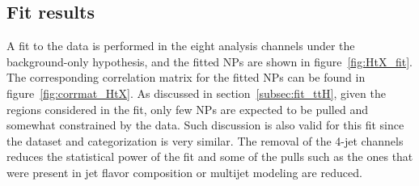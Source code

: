 \subsection{Fit results}
A fit to the data  is performed in the eight analysis channels under the background-only hypothesis, and the fitted NPs are shown in figure~\ref{fig:HtX_fit}.
The corresponding correlation matrix for the
fitted NPs can be found in figure~\ref{fig:corrmat_HtX}.
As discussed in section~\ref{subsec:fit_ttH}, given the regions considered in the fit, only few NPs are expected to be pulled and somewhat 
constrained by the data.
Such discussion is also valid for this fit since the dataset and categorization is very similar.
The removal of the 4-jet channels reduces the statistical power of the fit and some of the pulls such as the ones that were present in jet flavor composition or multijet modeling are reduced.

